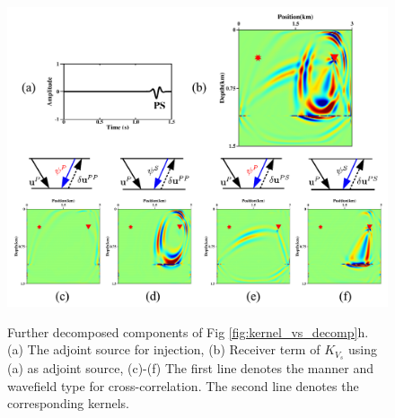 \begin{figure}[!htb]
   \centering
   {\includegraphics[width=1.0\textwidth]{Kernel/Combinations/K_vs_recPS.pdf}}
   \caption{Further decomposed components of Fig \ref{fig:kernel_vs_decomp}h. (a) The adjoint source
   for injection, (b) Receiver term of $K_{V_s}$ using (a) as adjoint source, (c)-(f) 
   The first line denotes the manner and wavefield type for cross-correlation.
   The second line denotes the corresponding kernels.
   }
   \label{fig:kernel_vs_recPS}
\end{figure}


